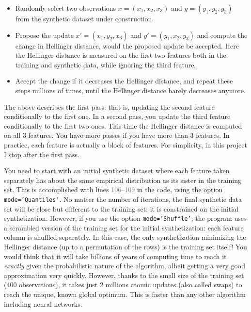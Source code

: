 \documentclass[oneside,10pt]{book}
\begin{document}
\begin{itemize}
\item Randomly select two observations $x = (x_1, x_2, x_3)$ and $y = (y_1, y_2, y_3)$ from the synthetic dataset under construction. 
\item Propose the update $x' = (x_1, y_2, x_3)$ and $y' = (y_1, x_2, y_3)$ and compute the change in Hellinger distance, would the proposed update be accepted.
Here the Hellinger distance is measured on the first two features both in the training and synthetic data, while ignoring the third feature.
\item Accept the change if it decreases the Hellinger distance, and repeat these steps millions of times, until the Hellinger distance barely decreases anymore.
\end{itemize}
\vspace{1ex}

\noindent The above describes the first pass: that is, updating the second feature conditionally to the first one. In a second pass, you update the third feature conditionally to the first two ones. This time the Hellinger distance is computed on all 3 features. You have more passes if you have more than 3 features. In practice, each feature is actually a block of features. For simplicity, in this project I stop after the first pass.  

You need to start with an initial synthetic dataset where each feature taken separately has about the same empirical distribution as its sister in the training set. 
This is accomplished with lines \textcolor{gray}{106--109} in the code, using the option \texttt{mode='Quantiles'}. No matter the number of iterations, the final synthetic data set will be close but different to the training set: it is constrained on the initial synthetization. However, if you use the option
 \texttt{mode='Shuffle'}, the program uses a scrambled version of the training set for the initial synthetization: each feature column is shuffled separately. 
In this case, the only synthetization minimizing the Hellinger distance (up to a permutation of the rows) is the training set itself! You would think that it will
 take billions of years of computing time to reach it {\em exactly} given the probabilistic nature of the algorithm, albeit getting a very good approximation very quickly.  However, thanks to the small size of the training set (400 observations), it takes just 2 millions atomic updates (also called swaps) to reach the unique, known global optimum. This is faster than any other algorithm
 including neural networks. 
\end{document}
